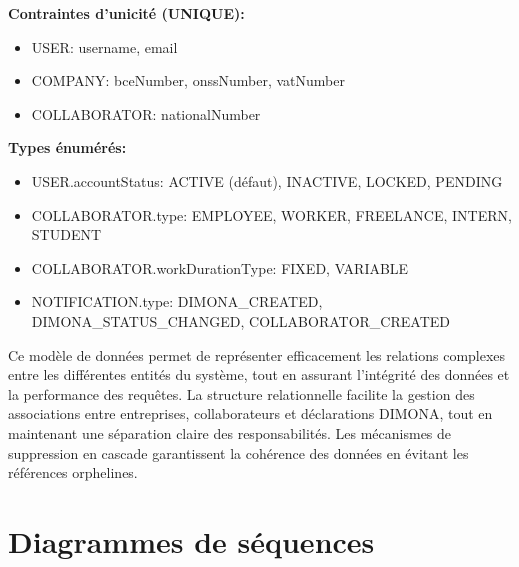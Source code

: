 \vspace{1cm}

\textbf{Contraintes d'unicité (UNIQUE):}
\begin{itemize}[leftmargin=*,label=\textcolor{darkgray}{$\bullet$},itemsep=0.3em]
  \item USER: username, email
  \item COMPANY: bceNumber, onssNumber, vatNumber
  \item COLLABORATOR: nationalNumber
\end{itemize}

\vspace{0.5cm}

\textbf{Types énumérés:}
\begin{itemize}[leftmargin=*,label=\textcolor{darkgray}{$\bullet$},itemsep=0.3em]
  \item USER.accountStatus: ACTIVE (défaut), INACTIVE, LOCKED, PENDING
  \item COLLABORATOR.type: EMPLOYEE, WORKER, FREELANCE, INTERN, STUDENT
  \item COLLABORATOR.workDurationType: FIXED, VARIABLE
  \item NOTIFICATION.type: DIMONA\_CREATED, DIMONA\_STATUS\_CHANGED, COLLABORATOR\_CREATED
\end{itemize}

\vspace{0.5cm}

\begin{tcolorbox}[
  title={\textbf{Modèle de données robuste}},
  colback=blue!5!white,
  colframe=primarycolor,
  fonttitle=\bfseries,
  boxrule=0.5mm,
  arc=2mm,
  left=6mm,
  right=6mm,
  top=6mm,
  bottom=6mm
]
Ce modèle de données permet de représenter efficacement les relations complexes entre les différentes entités du système, tout en assurant l'intégrité des données et la performance des requêtes. La structure relationnelle facilite la gestion des associations entre entreprises, collaborateurs et déclarations DIMONA, tout en maintenant une séparation claire des responsabilités. Les mécanismes de suppression en cascade garantissent la cohérence des données en évitant les références orphelines.
\end{tcolorbox}

\newpage

\section{Diagrammes de séquences}

